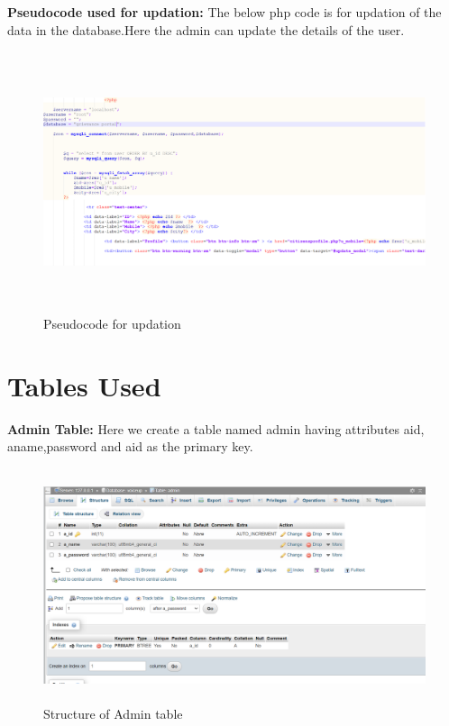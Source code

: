 \documentclass[12pt,a4paper]{report}
\begin{document}
\noindent \textbf {Pseudocode used for updation:}
The below php code is for updation of the data in the database.Here the admin can update the details of the user.
\begin{figure}[hbtp]
\centering
\includegraphics[width=6.4in,height=3in]{update.png}
\caption{Pseudocode for updation }
\end{figure}
\newpage
\section{Tables Used}
\textbf{Admin Table:}
Here we create a table named admin having attributes aid, aname,password and aid as the primary key.
\begin{figure}[hbtp]
\centering
\includegraphics[width=6.4in,height=2.7in]{fa.png}
\caption{Structure of Admin table}
\end{figure}
\end{document}
